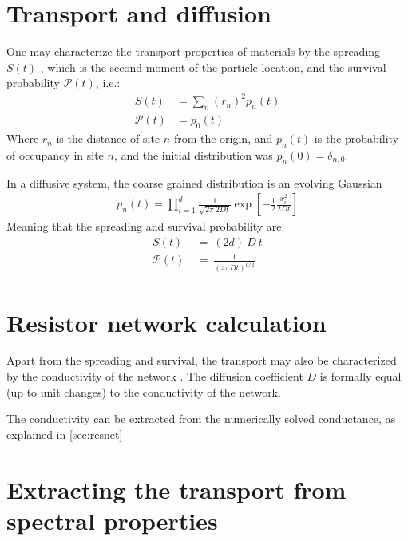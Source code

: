 


\section{Transport and diffusion}

One may characterize the transport properties of materials 
by the spreading $S(t)$ , which is the second moment of 
the particle location, and the survival probability $\mathcal{P}(t)$, i.e.:
%
\begin{align}
S(t) &= \sum_n (r_n)^2 p_n(t) \\
\mathcal{P}(t) &= p_0(t)
\end{align}
%
Where $r_n$ is the distance of site $n$ from the origin,
and $p_n(t)$ is the probability of occupancy in site $n$, and
the initial distribution was $p_n(0) = \delta_{n,0}$.


In a diffusive system, the coarse grained distribution is an evolving Gaussian
%
\begin{align}
p_n(t) = \prod_{i=1}^d \frac{1}{\sqrt{2\pi\ 2Dt}} \exp\left[-\frac{1}{2}\frac{x_i^2}{2Dt}\right]
\end{align}
%
Meaning that the spreading and survival probability are:
%
\begin{align}
S(t) \ &=\ (2d)\ D\ t \\
\mathcal{P}(t)\ &=\ \frac{1}{(4\pi D t)^{d/2}}
\end{align}
%


\section{Resistor network calculation}

Apart from the spreading and survival, the transport may
also be characterized by the conductivity of the network
\cite{halperin_remarks_1989,miller_impurity_1960,ambegaokar_hopping_1971,pollak_percolation_1972,
Aharony_effective_1991,stotland_random-matrix_2010,stotland_semilinear_2009}.
The diffusion coefficient $D$ is formally equal (up to unit
changes) to the conductivity of the network.


The conductivity can be extracted from the 
numerically solved conductance, as explained in \autoref{sec:resnet}

\section{Extracting the transport from spectral properties}\label{sec:spectrum}

